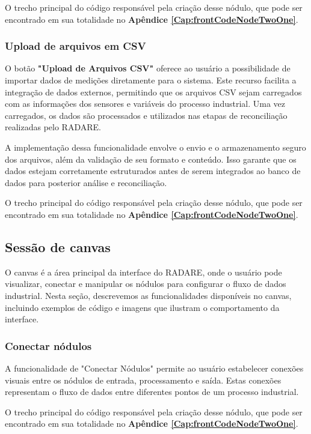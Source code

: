 O trecho principal do código responsável pela criação desse nódulo, que pode ser encontrado em sua totalidade no \textbf{Apêndice \ref{Cap:frontCodeNodeTwoOne}}.

\subsubsection{Upload de arquivos em CSV}

O botão \textbf{"Upload de Arquivos CSV"} oferece ao usuário a possibilidade de importar dados de medições diretamente para o sistema. Este recurso facilita a integração de dados externos, permitindo que os arquivos CSV sejam carregados com as informações dos sensores e variáveis do processo industrial. Uma vez carregados, os dados são processados e utilizados nas etapas de reconciliação realizadas pelo RADARE.

A implementação dessa funcionalidade envolve o envio e o armazenamento seguro dos arquivos, além da validação de seu formato e conteúdo. Isso garante que os dados estejam corretamente estruturados antes de serem integrados ao banco de dados para posterior análise e reconciliação.

O trecho principal do código responsável pela criação desse nódulo, que pode ser encontrado em sua totalidade no \textbf{Apêndice \ref{Cap:frontCodeNodeTwoOne}}.

\subsection{Sessão de canvas}

O canvas é a área principal da interface do RADARE, onde o usuário pode visualizar, conectar e manipular os nódulos para configurar o fluxo de dados industrial. Nesta seção, descrevemos as funcionalidades disponíveis no canvas, incluindo exemplos de código e imagens que ilustram o comportamento da interface.

\subsubsection{Conectar nódulos}

A funcionalidade de "Conectar Nódulos" permite ao usuário estabelecer conexões visuais entre os nódulos de entrada, processamento e saída. Estas conexões representam o fluxo de dados entre diferentes pontos de um processo industrial.

O trecho principal do código responsável pela criação desse nódulo, que pode ser encontrado em sua totalidade no \textbf{Apêndice \ref{Cap:frontCodeNodeTwoOne}}.
